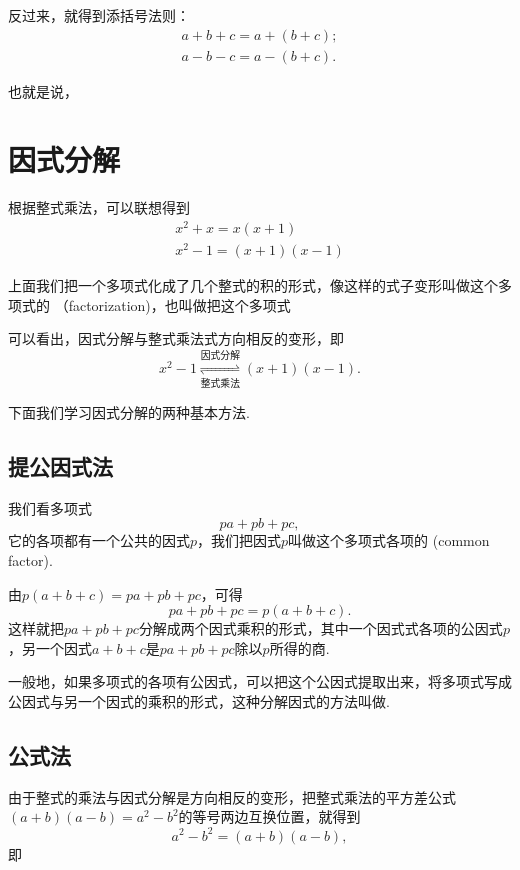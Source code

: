 \documentclass[UTF8,fontset=macnew]{book} %
\begin{document}
				反过来，就得到添括号法则：
			$$\begin{aligned}a+b+c=a+(b+c);\\a-b-c=a-(b+c).\end{aligned}$$
				
				也就是说，\textcolor[RGB]{4,165,218}{}
		\section{因式分解}
			根据整式乘法，可以联想得到
		$$\begin{gathered}x^2+x=x(x+1)\\x^2-1=(x+1)(x-1)\end{gathered}$$
		
			上面我们把一个多项式化成了几个整式的积的形式，像这样的式子变形叫做这个多项式的\textcolor[RGB]{4,165,218}{} （factorization)，也叫做把这个多项式\textcolor[RGB]{4,165,218}{}
			
			可以看出，因式分解与整式乘法式方向相反的变形，即
		$$x^2-1\overset{\text{因式分解}}{\underset{\text{整式乘法}}{\rightleftharpoons}}(x+1)(x-1).$$
		
			下面我们学习因式分解的两种基本方法.
			\subsection{提公因式法}
				我们看多项式
			$$pa+pb+pc,$$
			它的各项都有一个公共的因式$p$，我们把因式$p$叫做这个多项式各项的\textcolor[RGB]{4,165,218}{} (common factor).
			
				由$p(a+b+c)=pa+pb+pc$，可得
			$$pa+pb+pc=p(a+b+c).$$
			这样就把$pa+pb+pc$分解成两个因式乘积的形式，其中一个因式式各项的公因式$p$，另一个因式$a+b+c$是$pa+pb+pc$除以$p$所得的商.
			
				一般地，如果多项式的各项有公因式，可以把这个公因式提取出来，将多项式写成公因式与另一个因式的乘积的形式，这种分解因式的方法叫做\textcolor[RGB]{4,165,218}{}.
			\subsection{公式法}
				由于整式的乘法与因式分解是方向相反的变形，把整式乘法的平方差公式$(a+b)(a-b)=a^2-b^2$的等号两边互换位置，就得到
			$$\boxed{a^2-b^2=(a+b)(a-b),}$$
			即\textcolor[RGB]{4,165,218}{}
			
\end{document}
